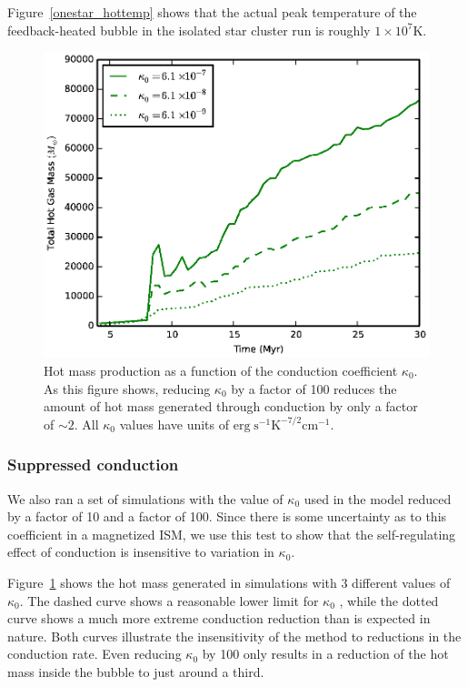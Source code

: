 Figure~\ref{onestar_hottemp}  shows that the actual peak temperature of the
feedback-heated bubble in the isolated star cluster run is roughly
$1\times10^7\mathrm{K}$.


\begin{figure}
    \includegraphics[width=\textwidth]{figures1/onestar_kappa.eps}
    \caption[Dependence of superbubble heated gas on conduction coefficient]{Hot
    mass production as a function of the conduction coefficient $\kappa_0$.  As
    this figure shows, reducing $\kappa_0$ by a factor of 100 reduces the amount
    of hot mass generated through conduction by only a factor of $\sim2$. All
    $\kappa_0$ values have units of $\mathrm{erg\; s^{-1} K^{-7/2} cm^{-1}}$.}
    \label{onestar_kappa}
\end{figure}

\subsubsection{Suppressed conduction}

We also ran a set of simulations with the value of $\kappa_0$ used in the model
reduced by a factor of 10 and a factor of 100.  Since there is some uncertainty
as to this coefficient in a magnetized ISM, we use this test to show that the
self-regulating effect of conduction is insensitive to variation in $\kappa_0$.

Figure~\ref{onestar_kappa} shows the hot mass generated in simulations with 3
different values of $\kappa_0$.  The dashed curve shows a reasonable lower limit
for $\kappa_0$ \citep{Cowie1977}, while the dotted curve shows a much more
extreme conduction reduction than is expected in nature.  Both curves illustrate
the insensitivity of the method to reductions in the conduction rate.  Even
reducing $\kappa_0$ by 100 only results in a reduction of the hot mass inside
the bubble to just around a third.  


